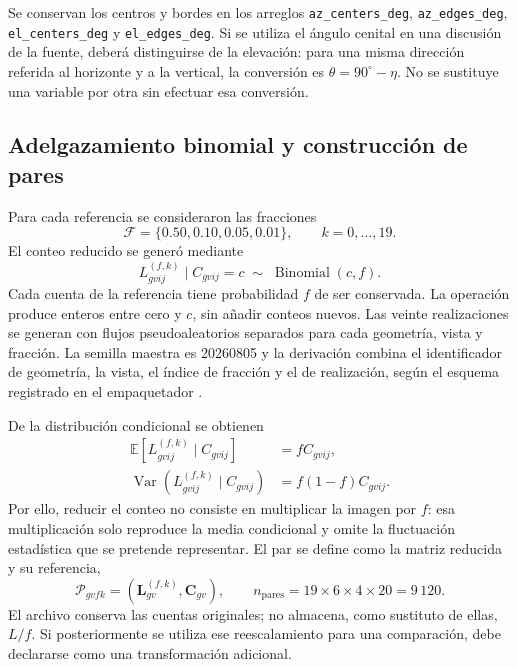 \documentclass[11pt,a4paper]{article}
\newcommand{\E}{\mathbb{E}}
\newcommand{\Var}{\operatorname{Var}}
\begin{document}
Se conservan los centros y bordes en los arreglos \texttt{az\_\allowbreak centers\_\allowbreak deg}, \texttt{az\_\allowbreak edges\_\allowbreak deg}, \texttt{el\_\allowbreak centers\_\allowbreak deg} y \texttt{el\_\allowbreak edges\_\allowbreak deg}. Si se utiliza el ángulo cenital en una discusión de la fuente, deberá distinguirse de la elevación: para una misma dirección referida al horizonte y a la vertical, la conversión es $\theta=90^\circ-\eta$. No se sustituye una variable por otra sin efectuar esa conversión.

\subsection{Adelgazamiento binomial y construcción de pares}

Para cada referencia se consideraron las fracciones
\begin{equation}
 \mathcal F=\{0.50,0.10,0.05,0.01\},\qquad k=0,\ldots,19.
\end{equation}
El conteo reducido se generó mediante
\begin{equation}
 L^{(f,k)}_{gvij}\mid C_{gvij}=c\;\sim\;\operatorname{Binomial}(c,f).
 \label{eq:binomial}
\end{equation}
Cada cuenta de la referencia tiene probabilidad $f$ de ser conservada. La operación produce enteros entre cero y $c$, sin añadir conteos nuevos. Las veinte realizaciones se generan con flujos pseudoaleatorios separados para cada geometría, vista y fracción. La semilla maestra es 20260805 y la derivación combina el identificador de geometría, la vista, el índice de fracción y el de realización, según el esquema registrado en el empaquetador \cite{datos}.

De la distribución condicional se obtienen
\begin{align}
 \E[L^{(f,k)}_{gvij}\mid C_{gvij}]&=fC_{gvij},\\
 \Var(L^{(f,k)}_{gvij}\mid C_{gvij})&=f(1-f)C_{gvij}.
 \label{eq:momentos}
\end{align}
Por ello, reducir el conteo no consiste en multiplicar la imagen por $f$: esa multiplicación solo reproduce la media condicional y omite la fluctuación estadística que se pretende representar. El par se define como la matriz reducida y su referencia,
\begin{equation}
 \mathcal P_{gvfk}=\left(\boldsymbol L^{(f,k)}_{gv},\boldsymbol C_{gv}\right),
 \qquad n_{\mathrm{pares}}=19\times6\times4\times20=9\,120.
\end{equation}
El archivo conserva las cuentas originales; no almacena, como sustituto de ellas, $L/f$. Si posteriormente se utiliza ese reescalamiento para una comparación, debe declararse como una transformación adicional.
\end{document}
